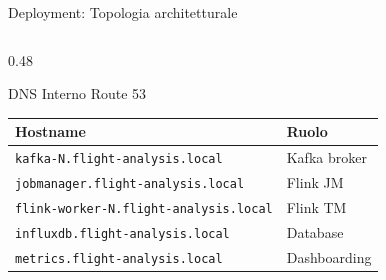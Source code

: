 \documentclass[10pt, aspectratio=169]{beamer}
\begin{document}
\begin{frame}{Deployment: Topologia architetturale}
\begin{columns}[T]
\begin{column}{0.48\textwidth}
            \begin{block}{\scriptsize DNS Interno Route 53}
                \centering
                \scriptsize
                \begin{tabular}{ll}
                    \hline
                    \textbf{Hostname} & \textbf{Ruolo} \\
                    \hline
                    \texttt{kafka-N.flight-analysis.local} & Kafka broker \\
                    \texttt{jobmanager.flight-analysis.local} & Flink JM \\
                    \texttt{flink-worker-N.flight-analysis.local} & Flink TM \\
                    \texttt{influxdb.flight-analysis.local} & Database \\
                    \texttt{metrics.flight-analysis.local} & Dashboarding \\
                    \hline
                \end{tabular}
            \end{block}
        \end{column}
    \end{columns}
\end{frame}
\end{document}
